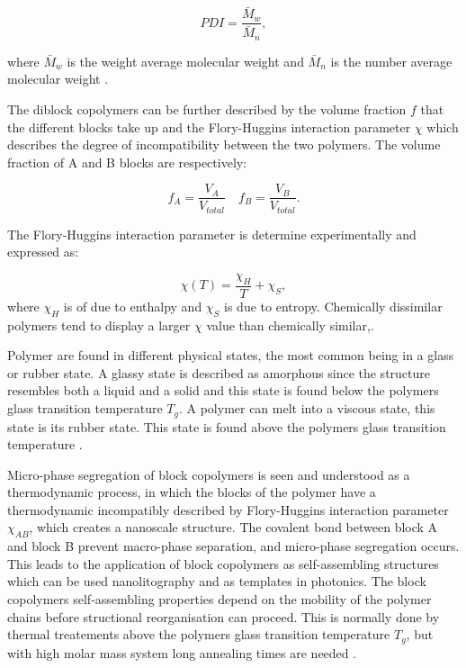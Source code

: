 \documentclass[MasterThesisMain.tex]{subfiles}
\begin{document}
\begin{equation}
PDI = \frac{\bar{M}_w}{\bar{M}_n},
\end{equation} 

where $\bar{M}_w$ is the weight average molecular weight and $\bar{M}_n$ is the number average molecular weight \cite{strobl2007physics}.

The diblock copolymers can be further described by the volume fraction $f$ that the different blocks take up and the Flory-Huggins interaction parameter $\chi$ which describes the degree of incompatibility between the two polymers. The volume fraction of A and B blocks are respectively:

\begin{equation}
f_A = \frac{V_A}{V_{total}} \quad f_B=\frac{V_B}{V_{total}}.
\end{equation}

The Flory-Huggins interaction parameter is determine experimentally and expressed as:

\begin{equation}
\chi(T) = \frac{\chi_H}{T} + \chi_S,
\end{equation} 
where $\chi_H$ is of due to enthalpy and $\chi_S$ is due to entropy. Chemically dissimilar polymers tend to display a larger $\chi$ value than chemically similar,\cite{BCPthermo}\cite{FHpolymer}.

Polymer are found in different physical states, the most common being in a glass or rubber state. A glassy state is described as amorphous since the structure resembles both a liquid and a solid and this state is found below the polymers glass transition temperature $T_g$. A polymer can melt into a viscous state, this state is its rubber state. This state is found above the polymers glass transition temperature \cite{petty2008molecular}. 

Micro-phase segregation of block copolymers is seen and understood as a thermodynamic process, in which the blocks of the polymer have a thermodynamic incompatibly described by Flory-Huggins interaction parameter $\chi_{AB}$, which creates a nanoscale structure. The covalent bond between block A and block B prevent macro-phase separation, and micro-phase segregation occurs.  This leads to the application of block copolymers as self-assembling structures which can be used nanolitography and as templates in photonics. The block copolymers self-assembling properties depend on the mobility of the polymer chains before structional reorganisation can proceed. This is normally done by thermal treatements above the polymers glass transition temperature $T_g$, but with high molar mass system long annealing times are needed \cite{SVABCP}.
\end{document}
